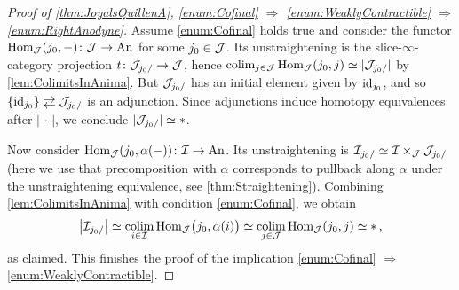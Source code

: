 \begin{proof}[Proof of \cref{thm:JoyalsQuillenA}, \cref{enum:Cofinal}  $\Rightarrow$ \cref{enum:WeaklyContractible} $\Rightarrow$ \cref{enum:RightAnodyne}]
	Assume \cref{enum:Cofinal} holds true and consider the functor $\operatorname{Hom}_{\mathcal{J}}(j_0,-)\colon \mathcal{J}\rightarrow \mathrm{An}$ for some $j_0\in \mathcal{J}$. Its unstraightening is the slice-$\infty$-category projection $t\colon \mathcal{J}_{j_0/}\rightarrow\mathcal{J}$, hence $\operatorname*{colim}_{j\in\mathcal{J}} \operatorname{Hom}_{\mathcal{J}}(j_0,j)\simeq \mathopen|\mathcal{J}_{j_0/}\mathclose|$ by \cref{lem:ColimitsInAnima}. But $\mathcal{J}_{j_0/}$ has an initial element given by $\operatorname{id}_{j_0}$, and so $\{\id_{j_0}\}\shortdoublelrmorphism \Jj_{j_0/}$ is an adjunction. Since adjunctions induce homotopy equivalences after $\left|\,\cdot\,\right|$, we conclude $\mathopen|\mathcal{J}_{j_0/}\mathclose|\simeq *$.
	
	Now consider $\operatorname{Hom}_{\mathcal{J}}(j_0,\alpha(-))\colon \mathcal{I}\rightarrow \mathrm{An}$. Its unstraightening is $\mathcal{I}_{j_0/}\simeq \mathcal{I}\times_{\mathcal{J}} \mathcal{J}_{j_0/}$ (here we use that precomposition with $\alpha$ corresponds to pullback along $\alpha$ under the unstraightening equivalence, see \cref{thm:Straightening}). Combining \cref{lem:ColimitsInAnima} with condition \cref{enum:Cofinal}, we obtain
	\begin{equation*}
		\bigl|\Ii_{j_0/}\bigr|\simeq\colimit_{i\in\Ii}\Hom_\Jj\lef(j_0,\alpha(i)\righ)\simeq \colimit_{j\in\Jj}\Hom_\Jj\!\left(j_0,j\right)\simeq *\,,
	\end{equation*}
	as claimed. This finishes the proof of the implication \cref{enum:Cofinal}  $\Rightarrow$ \cref{enum:WeaklyContractible}.
	

\end{proof}
